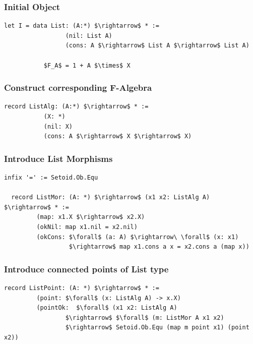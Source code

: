 \documentclass[11pt,oneside]{article}
\begin{document}
\subsubsection*{Initial Object}

\begin{lstlisting}[mathescape=true]
    let I = data List: (A:*) $\rightarrow$ * :=
                 (nil: List A)
                 (cons: A $\rightarrow$ List A $\rightarrow$ List A)

           $F_A$ = 1 + A $\times$ X
\end{lstlisting}

\subsubsection*{Construct corresponding F-Algebra}

\begin{lstlisting}[mathescape=true]
    record ListAlg: (A:*) $\rightarrow$ * :=
           (X: *)
           (nil: X)
           (cons: A $\rightarrow$ X $\rightarrow$ X)

\end{lstlisting}

\subsubsection*{Introduce List Morphisms}

\begin{lstlisting}[mathescape=true]
  infix '=' := Setoid.Ob.Equ

  record ListMor: (A: *) $\rightarrow$ (x1 x2: ListAlg A) $\rightarrow$ * :=
         (map: x1.X $\rightarrow$ x2.X)
         (okNil: map x1.nil = x2.nil)
         (okCons: $\forall$ (a: A) $\rightarrow\ \forall$ (x: x1)
                  $\rightarrow$ map x1.cons a x = x2.cons a (map x))
\end{lstlisting}

\subsubsection*{Introduce connected points of List type}

\begin{lstlisting}[mathescape=true]
  record ListPoint: (A: *) $\rightarrow$ * :=
         (point: $\forall$ (x: ListAlg A) -> x.X)
         (pointOk:  $\forall$ (x1 x2: ListAlg A)
                 $\rightarrow$ $\forall$ (m: ListMor A x1 x2)
                 $\rightarrow$ Setoid.Ob.Equ (map m point x1) (point x2))
\end{lstlisting}
\end{document}
